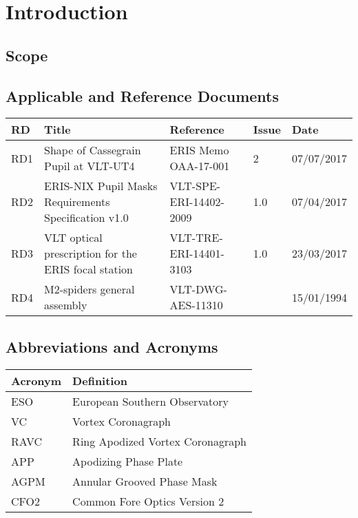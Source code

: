 \documentclass[a4paper,11pt]{article}
\begin{document}
\clearpage
\tableofcontents

\listoffigures

\listoftables

\clearpage

\section{Introduction}

\subsection{Scope}

\subsection{Applicable and Reference Documents}

\begin{tabular}{@{}lllll@{}}
\toprule
RD 	& Title 							& Reference & Issue & Date \\
\midrule
RD1	& Shape of Cassegrain Pupil at VLT-UT4      			& ERIS Memo OAA-17-001		&2       & 07/07/2017  \\
	RD2	& ERIS-NIX Pupil Masks Requirements Specification v1.0      	& VLT-SPE-ERI-14402-2009	&1.0     & 07/04/2017  \\
RD3	& VLT optical prescription for the ERIS focal station       	& VLT-TRE-ERI-14401-3103	&1.0	&  23/03/2017  \\
RD4	& M2-spiders general assembly     				& VLT-DWG-AES-11310		&	&  15/01/1994 \\
\bottomrule
\end{tabular}

\subsection{Abbreviations and Acronyms}

\begin{tabular}{@{}ll@{}}
\toprule
Acronym & Definition \\
\midrule
ESO     & European Southern Observatory \\
VC      & Vortex Coronagraph           \\
RAVC    & Ring Apodized Vortex Coronagraph \\
APP     & Apodizing Phase Plate        \\
AGPM    & Annular Grooved Phase Mask   \\
CFO2    & Common Fore Optics Version 2 \\
\bottomrule
\end{tabular}
\end{document}
